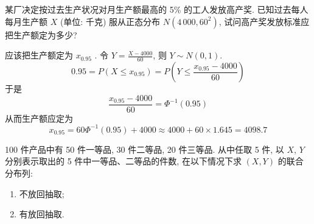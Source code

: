 \documentclass[../main.tex]{subfiles}
\begin{document}
\begin{exercise}{}{}
某厂决定按过去生产状况对月生产额最高的 5\% 的工人发放高产奖. 已知过去每人每月生产额 $X$ (单位: 千克) 服从正态分布 $N(4\,000, 60^2)$, 试问高产奖发放标准应把生产额定为多少?
\end{exercise}
\begin{solution}
    应该把生产额定为 \(  x_{0.95} \) . 令 \(  Y= \frac{X-4000 }{60 }   \), 则 \(  Y\sim N\left( 0,1 \right)   \).  \[
    0.95= P\left( X\le x_{0.95} \right)=  P\left( Y\le \frac{x_{0.95}-4000 }{60 }  \right) 
    \]于是 \[
    \frac{x_{0.95}-4000 }{60 }= \Phi ^{-1} \left( 0.95 \right)  
    \] 从而生产额应定为 \[
    x_{0.95}= 60 \Phi ^{-1} \left( 0.95 \right)+ 4000\approx 4000+ 60\times 1.645= 4098.7
    \]
\end{solution}
\begin{exercise}{}{}
100 件产品中有 50 件一等品, 30 件二等品, 20 件三等品. 从中任取 5 件, 以 $X$, $Y$ 分别表示取出的 5 件中一等品、二等品的件数, 在以下情况下求 $(X, Y)$ 的联合分布列:

\begin{enumerate}
    \item 不放回抽取;
    \item 有放回抽取.
\end{enumerate}
\end{exercise}
\end{document}

